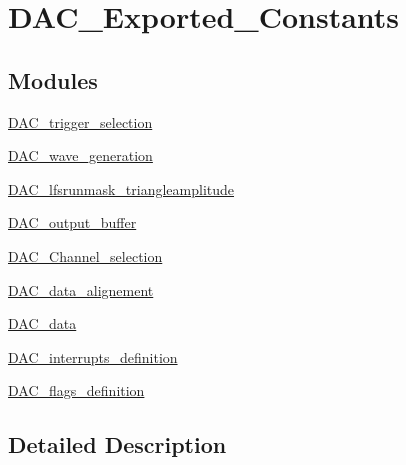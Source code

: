 \hypertarget{group___d_a_c___exported___constants}{}\section{D\+A\+C\+\_\+\+Exported\+\_\+\+Constants}
\label{group___d_a_c___exported___constants}
\subsection*{Modules}
\begin{DoxyCompactItemize}
\item 
\hyperlink{group___d_a_c__trigger__selection}{D\+A\+C\+\_\+trigger\+\_\+selection}
\item 
\hyperlink{group___d_a_c__wave__generation}{D\+A\+C\+\_\+wave\+\_\+generation}
\item 
\hyperlink{group___d_a_c__lfsrunmask__triangleamplitude}{D\+A\+C\+\_\+lfsrunmask\+\_\+triangleamplitude}
\item 
\hyperlink{group___d_a_c__output__buffer}{D\+A\+C\+\_\+output\+\_\+buffer}
\item 
\hyperlink{group___d_a_c___channel__selection}{D\+A\+C\+\_\+\+Channel\+\_\+selection}
\item 
\hyperlink{group___d_a_c__data__alignement}{D\+A\+C\+\_\+data\+\_\+alignement}
\item 
\hyperlink{group___d_a_c__data}{D\+A\+C\+\_\+data}
\item 
\hyperlink{group___d_a_c__interrupts__definition}{D\+A\+C\+\_\+interrupts\+\_\+definition}
\item 
\hyperlink{group___d_a_c__flags__definition}{D\+A\+C\+\_\+flags\+\_\+definition}
\end{DoxyCompactItemize}


\subsection{Detailed Description}
